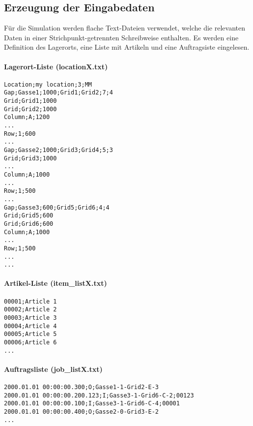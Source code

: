 \subsection{Erzeugung der Eingabedaten}
Für die Simulation werden flache Text-Dateien verwendet, welche die relevanten Daten in einer Strichpunkt-getrennten Schreibweise enthalten. Es werden eine Definition des Lagerorts, eine Liste mit Artikeln und eine Auftragsiste eingelesen. 
%
\paragraph{Lagerort-Liste (locationX.txt)}
\begin{verbatim}
Location;my location;3;MM
Gap;Gasse1;1000;Grid1;Grid2;7;4
Grid;Grid1;1000
Grid;Grid2;1000
Column;A;1200
...
Row;1;600
...
Gap;Gasse2;1000;Grid3;Grid4;5;3
Grid;Grid3;1000
...
Column;A;1000
...
Row;1;500
...
Gap;Gasse3;600;Grid5;Grid6;4;4
Grid;Grid5;600
Grid;Grid6;600
Column;A;1000
...
Row;1;500
...
...
\end{verbatim}
%
\paragraph{Artikel-Liste (item\_listX.txt)}\label{art-list}
\begin{verbatim}
00001;Article 1
00002;Article 2
00003;Article 3
00004;Article 4
00005;Article 5
00006;Article 6
...
\end{verbatim}
%
\paragraph{Auftragsliste (job\_listX.txt)}
\begin{verbatim}
2000.01.01 00:00:00.300;O;Gasse1-1-Grid2-E-3
2000.01.01 00:00:00.200.123;I;Gasse3-1-Grid6-C-2;00123
2000.01.01 00:00:00.100;I;Gasse3-1-Grid6-C-4;00001
2000.01.01 00:00:00.400;O;Gasse2-0-Grid3-E-2
...
\end{verbatim}
%



